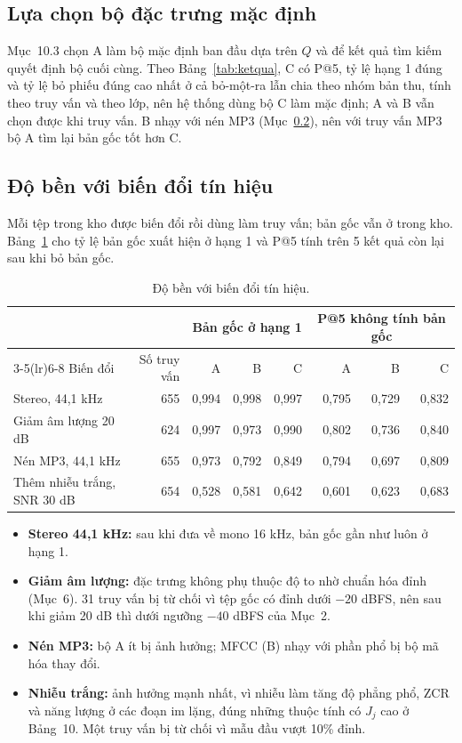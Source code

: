 \documentclass[11pt,a4paper]{article}
\begin{document}
\subsection{Lựa chọn bộ đặc trưng mặc định}\label{sec:chonbo}
Mục~10.3 chọn A làm bộ mặc định ban đầu dựa trên $Q$ và để kết quả tìm kiếm quyết định bộ cuối cùng. Theo Bảng~\ref{tab:ketqua}, C có P@5, tỷ lệ hạng 1 đúng và tỷ lệ bỏ phiếu đúng cao nhất ở cả bỏ-một-ra lẫn chia theo nhóm bản thu, tính theo truy vấn và theo lớp, nên hệ thống dùng bộ C làm mặc định; A và B vẫn chọn được khi truy vấn. B nhạy với nén MP3 (Mục~\ref{sec:doben}), nên với truy vấn MP3 bộ A tìm lại bản gốc tốt hơn C.

\subsection{Độ bền với biến đổi tín hiệu}\label{sec:doben}
Mỗi tệp trong kho được biến đổi rồi dùng làm truy vấn; bản gốc vẫn ở trong kho. Bảng~\ref{tab:doben} cho tỷ lệ bản gốc xuất hiện ở hạng 1 và P@5 tính trên 5 kết quả còn lại sau khi bỏ bản gốc.
\begin{table}[htbp]
\centering\small
\caption{Độ bền với biến đổi tín hiệu.}\label{tab:doben}
\begin{tabular}{lrrrrrrr}
\toprule
& & \multicolumn{3}{c}{Bản gốc ở hạng 1} & \multicolumn{3}{c}{P@5 không tính bản gốc}\\
\cmidrule(lr){3-5}\cmidrule(lr){6-8}
Biến đổi & Số truy vấn & A & B & C & A & B & C\\\midrule
Stereo, 44,1 kHz & 655 & 0,994 & 0,998 & 0,997 & 0,795 & 0,729 & 0,832\\
Giảm âm lượng 20 dB & 624 & 0,997 & 0,973 & 0,990 & 0,802 & 0,736 & 0,840\\
Nén MP3, 44,1 kHz & 655 & 0,973 & 0,792 & 0,849 & 0,794 & 0,697 & 0,809\\
Thêm nhiễu trắng, SNR 30 dB & 654 & 0,528 & 0,581 & 0,642 & 0,601 & 0,623 & 0,683\\\bottomrule
\end{tabular}
\end{table}
\begin{itemize}
\item \textbf{Stereo 44,1 kHz:} sau khi đưa về mono 16 kHz, bản gốc gần như luôn ở hạng 1.
\item \textbf{Giảm âm lượng:} đặc trưng không phụ thuộc độ to nhờ chuẩn hóa đỉnh (Mục~6). 31 truy vấn bị từ chối vì tệp gốc có đỉnh dưới $-20$ dBFS, nên sau khi giảm 20 dB thì dưới ngưỡng $-40$ dBFS của Mục~2.
\item \textbf{Nén MP3:} bộ A ít bị ảnh hưởng; MFCC (B) nhạy với phần phổ bị bộ mã hóa thay đổi.
\item \textbf{Nhiễu trắng:} ảnh hưởng mạnh nhất, vì nhiễu làm tăng độ phẳng phổ, ZCR và năng lượng ở các đoạn im lặng, đúng những thuộc tính có $J_j$ cao ở Bảng~10. Một truy vấn bị từ chối vì mẫu đầu vượt 10\% đỉnh.
\end{itemize}
\end{document}

